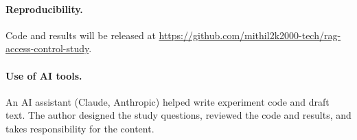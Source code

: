 \documentclass[11pt]{article}
\begin{document}
\paragraph{Reproducibility.} Code and results will be released at
\newline\url{https://github.com/mithil2k2000-tech/rag-access-control-study}.

\paragraph{Use of AI tools.} An AI assistant (Claude, Anthropic) helped write experiment code and draft text. The author designed the
study questions, reviewed the code and results, and takes responsibility for the content.



\end{document}
